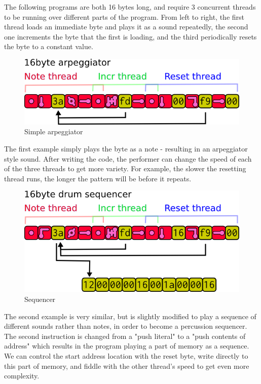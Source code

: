 \documentclass[letterpaper, 12pt]{article}
\begin{document}
The following programs are both 16 bytes long, and require 3 concurrent threads to be running over different parts of the program. From left to right, the first thread loads an immediate byte and plays it as a sound repeatedly, the second one increments the byte that the first is loading, and the third periodically resets the byte to a constant value.
 
\begin{figure}
	\centering
		\includegraphics[width=13cm]{bbds-arp}
	\caption{Simple arpeggiator}
	\label{fig:fig_bbds-arp}
\end{figure}

The first example simply plays the byte as a note - resulting in an arpeggiator style sound. After writing the code, the performer can change the speed of each of the three threads to get more variety. For example, the slower the resetting thread runs, the longer the pattern will be before it repeats.

\begin{figure}
	\centering
		\includegraphics[width=13cm]{bbds-seq}
	\caption{Sequencer}
	\label{fig:fig_bbds-seq}
\end{figure}

The second example is very similar, but is slightly modified to play a sequence of different sounds rather than notes, in order to become a percussion sequencer. The second instruction is changed from a "push literal" to a "push contents of address" which results in the program playing a part of memory as a sequence. We can control the start address location with the reset byte, write directly to this part of memory, and fiddle with the other thread's speed to get even more complexity.
\end{document}
